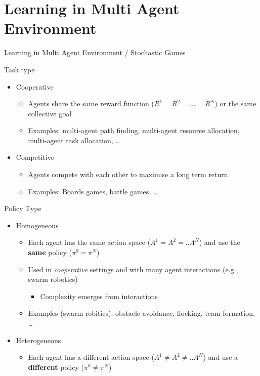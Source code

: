 \documentclass[presentation, 8pt]{beamer}\mode<presentation>{\usetheme{AMSBolognaFC}}
\begin{document}
\section{Learning in Multi Agent Environment}
\begin{frame}[allowframebreaks]{Learning in Multi Agent Environment / Stochastic Games}
\begin{exampleblock}{Task type}
	\begin{itemize}
		\item Cooperative
		\begin{itemize}
			\item Agents share the same reward function ($R^1 = R^2 = \dots = R^N$) or the same collective goal
			\item Examples: multi-agent path finding, multi-agent resource allocation, multi-agent task allocation, \dots
		\end{itemize}
		\item Competitive
		\begin{itemize}
			\item Agents compete with each other to maximise a long term return
			\item Examples: Boards games, battle games, \dots
		\end{itemize}
	\end{itemize}
\end{exampleblock}
\begin{exampleblock}{Policy Type}
\begin{itemize}
	\item Homogeneous
	\begin{itemize}
		\item Each agent has the same action space ($ A^1 = A^2 = .. A ^N$) and use the \textbf{same} policy ($ \pi^0 = \pi^N$)
		\item Used in \emph{cooperative} settings and with many agent interactions (e.g., swarm robotics)
		\begin{itemize}
			\item Complexity emerges from interactions
		\end{itemize}
		\item Examples (swarm robitics): obstacle avoidance, flocking, team formation, \dots
	\end{itemize}
	\item Heterogeneous
	\begin{itemize}
		\item Each agent has a different action space ($ A^1 \neq A^2 \neq .. A ^N$) and use a \textbf{different} policy ($ \pi^0 \neq \pi^N$)

\end{itemize}
\end{itemize}
\end{exampleblock}
\end{frame}
\end{document}
